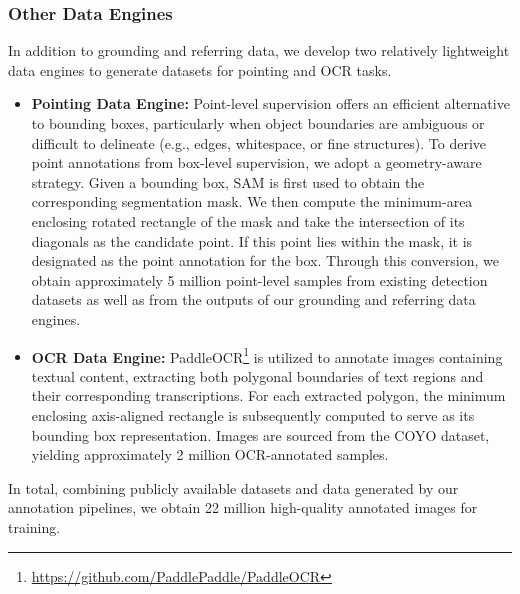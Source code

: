 \subsubsection{Other Data Engines}
In addition to grounding and referring data, we develop two relatively lightweight data engines to generate datasets for pointing and OCR tasks.

\begin{itemize}
    \item \textbf{Pointing Data Engine:} Point-level supervision offers an efficient alternative to bounding boxes, particularly when object boundaries are ambiguous or difficult to delineate (e.g., edges, whitespace, or fine structures). To derive point annotations from box-level supervision, we adopt a geometry-aware strategy. Given a bounding box, SAM is first used to obtain the corresponding segmentation mask. We then compute the minimum-area enclosing rotated rectangle of the mask and take the intersection of its diagonals as the candidate point. If this point lies within the mask, it is designated as the point annotation for the box. Through this conversion, we obtain approximately 5 million point-level samples from existing detection datasets as well as from the outputs of our grounding and referring data engines.
    
    \item \textbf{OCR Data Engine:} PaddleOCR\footnote{\url{https://github.com/PaddlePaddle/PaddleOCR}} is utilized to annotate images containing textual content, extracting both polygonal boundaries of text regions and their corresponding transcriptions. For each extracted polygon, the minimum enclosing axis-aligned rectangle is subsequently computed to serve as its bounding box representation. Images are sourced from the COYO dataset, yielding approximately 2 million OCR-annotated samples.
\end{itemize}

In total, combining publicly available datasets and data generated by our annotation pipelines, we obtain 22 million high-quality annotated images for training.